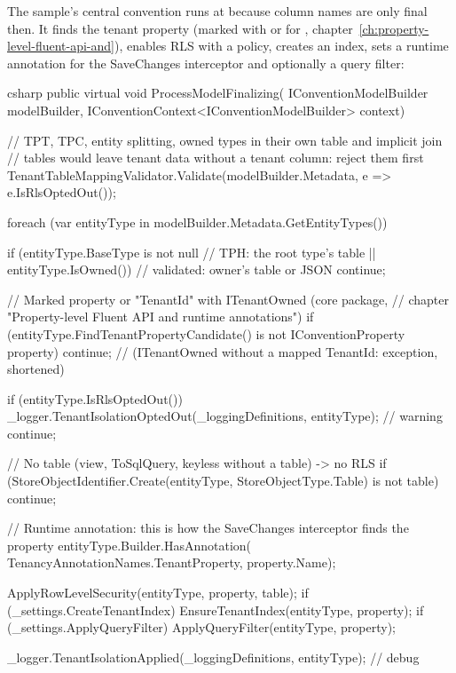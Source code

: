 The sample's central convention runs at  because column
names are only final then. It finds the tenant property (marked with
 or
 for ,
chapter~\ref{ch:property-level-fluent-api-and}), enables RLS with a policy, creates an
index, sets a runtime annotation for the SaveChanges interceptor and optionally a query
filter:

\begin{sourcecode}{csharp}
public virtual void ProcessModelFinalizing(
    IConventionModelBuilder modelBuilder,
    IConventionContext<IConventionModelBuilder> context)
{
    // TPT, TPC, entity splitting, owned types in their own table and implicit join
    // tables would leave tenant data without a tenant column: reject them first
    TenantTableMappingValidator.Validate(modelBuilder.Metadata, e => e.IsRlsOptedOut());

    foreach (var entityType in modelBuilder.Metadata.GetEntityTypes())
    {
        if (entityType.BaseType is not null       // TPH: the root type's table
            || entityType.IsOwned())              // validated: owner's table or JSON
            continue;

        // Marked property or "TenantId" with ITenantOwned (core package,
        // chapter "Property-level Fluent API and runtime annotations")
        if (entityType.FindTenantPropertyCandidate() is not IConventionProperty property)
            continue;      // (ITenantOwned without a mapped TenantId: exception, shortened)

        if (entityType.IsRlsOptedOut())
        {
            _logger.TenantIsolationOptedOut(_loggingDefinitions, entityType);  // warning
            continue;
        }

        // No table (view, ToSqlQuery, keyless without a table) -> no RLS
        if (StoreObjectIdentifier.Create(entityType, StoreObjectType.Table)
            is not { } table)
            continue;

        // Runtime annotation: this is how the SaveChanges interceptor finds the property
        entityType.Builder.HasAnnotation(
            TenancyAnnotationNames.TenantProperty, property.Name);

        ApplyRowLevelSecurity(entityType, property, table);
        if (_settings.CreateTenantIndex) EnsureTenantIndex(entityType, property);
        if (_settings.ApplyQueryFilter) ApplyQueryFilter(entityType, property);

        _logger.TenantIsolationApplied(_loggingDefinitions, entityType);       // debug
    }
}
\end{sourcecode}

